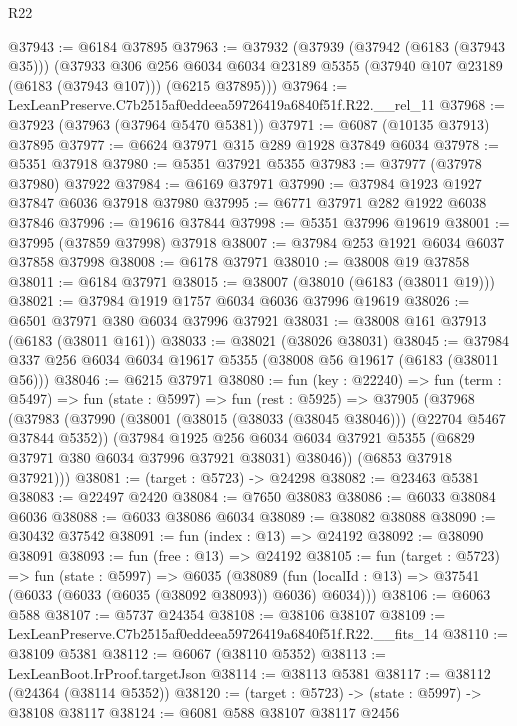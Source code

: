 \begin{lexlean}{R22}
\begin{coremodule}
@37943 := @6184 @37895
@37963 := @37932
    (@37939
      (@37942 (@6183 (@37943 @35)))
      (@37933
        @306
        @256
        @6034
        @6034
        @23189
        @5355
        (@37940 @107 @23189 (@6183 (@37943 @107)))
        (@6215 @37895)))
@37964 := LexLeanPreserve.C7b2515af0eddeea59726419a6840f51f.R22.__rel_11
@37968 := @37923 (@37963 (@37964 @5470 @5381))
@37971 := @6087 (@10135 @37913) @37895
@37977 := @6624 @37971 @315 @289 @1928 @37849 @6034
@37978 := @5351 @37918
@37980 := @5351 @37921 @5355
@37983 := @37977 (@37978 @37980) @37922
@37984 := @6169 @37971
@37990 := @37984 @1923 @1927 @37847 @6036 @37918 @37980
@37995 := @6771 @37971 @282 @1922 @6038 @37846
@37996 := @19616 @37844
@37998 := @5351 @37996 @19619
@38001 := @37995 (@37859 @37998) @37918
@38007 := @37984 @253 @1921 @6034 @6037 @37858 @37998
@38008 := @6178 @37971
@38010 := @38008 @19 @37858
@38011 := @6184 @37971
@38015 := @38007 (@38010 (@6183 (@38011 @19)))
@38021 := @37984 @1919 @1757 @6034 @6036 @37996 @19619
@38026 := @6501 @37971 @380 @6034 @37996 @37921
@38031 := @38008 @161 @37913 (@6183 (@38011 @161))
@38033 := @38021 (@38026 @38031)
@38045 := @37984 @337 @256 @6034 @6034 @19617 @5355 (@38008 @56 @19617 (@6183 (@38011 @56)))
@38046 := @6215 @37971
@38080 := fun (key : @22240) =>
  fun (term : @5497) =>
  fun (state : @5997) =>
  fun (rest : @5925) =>
  @37905
    (@37968
      (@37983
        (@37990
          (@38001 (@38015 (@38033 (@38045 @38046))) (@22704 @5467 @37844 @5352))
          (@37984
            @1925
            @256
            @6034
            @6034
            @37921
            @5355
            (@6829 @37971 @380 @6034 @37996 @37921 @38031)
            @38046))
        (@6853 @37918 @37921)))
@38081 := (target : @5723) -> @24298
@38082 := @23463 @5381
@38083 := @22497 @2420
@38084 := @7650 @38083
@38086 := @6033 @38084 @6036
@38088 := @6033 @38086 @6034
@38089 := @38082 @38088
@38090 := @30432 @37542
@38091 := fun (index : @13) => @24192
@38092 := @38090 @38091
@38093 := fun (free : @13) => @24192
@38105 := fun (target : @5723) =>
  fun (state : @5997) =>
  @6035 (@38089 (fun (localId : @13) => @37541 (@6033 (@6033 (@6035 (@38092 @38093)) @6036) @6034)))
@38106 := @6063 @588
@38107 := @5737 @24354
@38108 := @38106 @38107
@38109 := LexLeanPreserve.C7b2515af0eddeea59726419a6840f51f.R22.__fits_14
@38110 := @38109 @5381
@38112 := @6067 (@38110 @5352)
@38113 := LexLeanBoot.IrProof.targetJson
@38114 := @38113 @5381
@38117 := @38112 (@24364 (@38114 @5352))
@38120 := (target : @5723) -> (state : @5997) -> @38108 @38117
@38124 := @6081 @588 @38107 @38117 @2456

\end{coremodule}
\end{lexlean}

